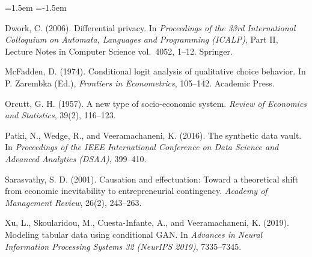 \documentclass[12pt,a4paper]{article}
\begin{document}
\begin{list}{}{\leftmargin=1.5em \itemindent=-1.5em \itemsep=8pt}

\item \hypertarget{ref:dwork2006}{}Dwork, C. (2006). Differential privacy.
In \textit{Proceedings of the 33rd International Colloquium on Automata,
Languages and Programming (ICALP)}, Part II, Lecture Notes in Computer
Science vol.\ 4052, 1--12. Springer.

\item \hypertarget{ref:mcfadden1974}{}McFadden, D. (1974). Conditional
logit analysis of qualitative choice behavior. In P. Zarembka (Ed.),
\textit{Frontiers in Econometrics}, 105--142. Academic Press.

\item \hypertarget{ref:orcutt1957}{}Orcutt, G. H. (1957). A new type of
socio-economic system. \textit{Review of Economics and Statistics}, 39(2),
116--123.

\item \hypertarget{ref:patki2016}{}Patki, N., Wedge, R., and
Veeramachaneni, K. (2016). The synthetic data vault. In \textit{Proceedings
of the IEEE International Conference on Data Science and Advanced Analytics
(DSAA)}, 399--410.

\item \hypertarget{ref:sarasvathy2001}{}Sarasvathy, S. D. (2001).
Causation and effectuation: Toward a theoretical shift from economic
inevitability to entrepreneurial contingency. \textit{Academy of
Management Review}, 26(2), 243--263.

\item \hypertarget{ref:xu2019}{}Xu, L., Skoularidou, M., Cuesta-Infante,
A., and Veeramachaneni, K. (2019). Modeling tabular data using conditional
GAN. In \textit{Advances in Neural Information Processing Systems 32
(NeurIPS 2019)}, 7335--7345.

\end{list}
\end{document}
